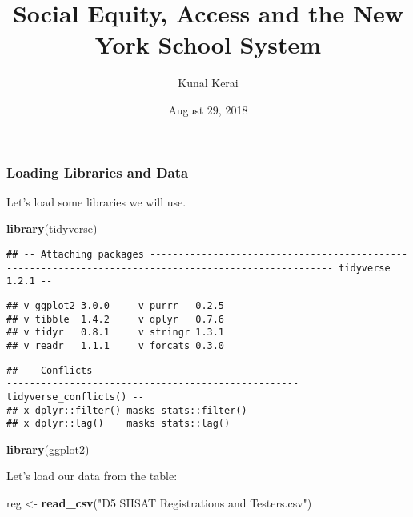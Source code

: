 \documentclass[]{article}
\title{Social Equity, Access and the New York School System}
\author{Kunal Kerai}
\date{August 29, 2018}
\newenvironment{Shaded}{\begin{snugshade}}{\end{snugshade}}
\newcommand{\KeywordTok}[1]{\textcolor[rgb]{0.13,0.29,0.53}{\textbf{#1}}}
\newcommand{\StringTok}[1]{\textcolor[rgb]{0.31,0.60,0.02}{#1}}
\newcommand{\NormalTok}[1]{#1}
\begin{document}
\maketitle

\subsubsection{Loading Libraries and
Data}\label{loading-libraries-and-data}

Let's load some libraries we will use.

\begin{Shaded}
\begin{Highlighting}[]
\KeywordTok{library}\NormalTok{(tidyverse)}
\end{Highlighting}
\end{Shaded}

\begin{verbatim}
## -- Attaching packages ------------------------------------------------------------------------------------------------------ tidyverse 1.2.1 --
\end{verbatim}

\begin{verbatim}
## v ggplot2 3.0.0     v purrr   0.2.5
## v tibble  1.4.2     v dplyr   0.7.6
## v tidyr   0.8.1     v stringr 1.3.1
## v readr   1.1.1     v forcats 0.3.0
\end{verbatim}

\begin{verbatim}
## -- Conflicts --------------------------------------------------------------------------------------------------------- tidyverse_conflicts() --
## x dplyr::filter() masks stats::filter()
## x dplyr::lag()    masks stats::lag()
\end{verbatim}

\begin{Shaded}
\begin{Highlighting}[]
\KeywordTok{library}\NormalTok{(ggplot2)}
\end{Highlighting}
\end{Shaded}

Let's load our data from the table:

\begin{Shaded}
\begin{Highlighting}[]
\NormalTok{reg <-}\StringTok{ }\KeywordTok{read_csv}\NormalTok{(}\StringTok{"D5 SHSAT Registrations and Testers.csv"}\NormalTok{)}
\end{Highlighting}
\end{Shaded}
\end{document}
